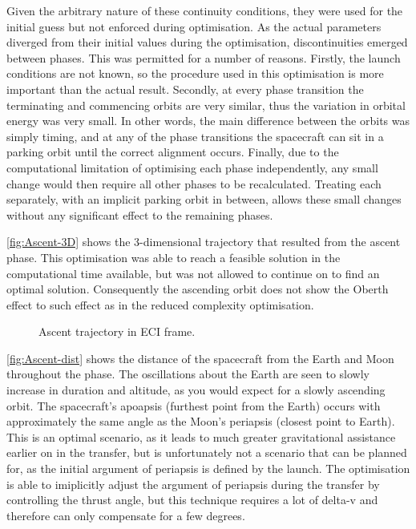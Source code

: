 Given the arbitrary nature of these continuity conditions, they were used for the initial guess but not enforced during optimisation. As the actual parameters diverged from their initial values during the optimisation, discontinuities emerged between phases. This was permitted for a number of reasons. Firstly, the launch conditions are not known, so the procedure used in this optimisation is more important than the actual result. Secondly, at every phase transition the terminating and commencing orbits are very similar, thus the variation in orbital energy was very small. In other words, the main difference between the orbits was simply timing, and at any of the phase transitions the spacecraft can sit in a parking orbit until the correct alignment occurs. Finally, due to the computational limitation of optimising each phase independently, any small change would then require all other phases to be recalculated. Treating each separately, with an implicit parking orbit in between, allows these small changes without any significant effect to the remaining phases.

\autoref{fig:Ascent-3D} shows the 3-dimensional trajectory that resulted from the ascent phase. This optimisation was able to reach a feasible solution in the computational time available, but was not allowed to continue on to find an optimal solution. Consequently the ascending orbit does not show the Oberth effect to such effect as in the reduced complexity optimisation.

\begin{figure}
\caption{Ascent trajectory in ECI frame.}
\label{fig:Ascent-3D}
\centering
\def\svgwidth{\figurewidth}

\end{figure}

\autoref{fig:Ascent-dist} shows the distance of the spacecraft from the Earth and Moon throughout the phase. The oscillations about the Earth are seen to slowly increase in duration and altitude, as you would expect for a slowly ascending orbit. The spacecraft's apoapsis (furthest point from the Earth) occurs with approximately the same angle as the Moon's periapsis (closest point to Earth). This is an optimal scenario, as it leads to much greater gravitational assistance earlier on in the transfer, but is unfortunately not a scenario that can be planned for, as the initial argument of periapsis is defined by the launch. The optimisation is able to imiplicitly adjust the argument of periapsis during the transfer by controlling the thrust angle, but this technique requires a lot of delta-v and therefore can only compensate for a few degrees.

